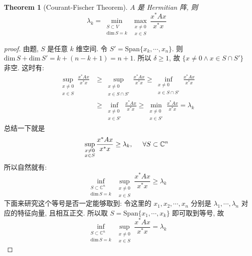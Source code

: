 \documentclass{article}
\newtheorem{theorem}{Theorem}
\def\dim{\mathrm{dim}\,}
\begin{document}
\begin{theorem}[Courant-Fischer Theorem]
  $A$ 是 Hermitian 阵, 则
  \[\lambda_k = \min_{\substack{S\subset V\\ \dim S = k}}\max_{\substack{x\not=0\\x\in S}}\frac{x^*Ax}{x^*x}\]
\end{theorem}
\begin{proof}[proof]
  由题, $S$ 是任意 $k$ 维空间.
  令 $S' = \mathrm{Span}\{x_k, \cdots, x_n\}$.
  则 $\dim S + \dim S' = k + (n - k + 1) = n + 1$.
  所以 $\delta \geq 1$, 故 $\{x\not=0 \land x\in S\cap S'\}$ 非空.
  这时有:
  \begin{align*}
    \sup_{\substack{x\not=0\\x\in S}}\frac{x^*Ax}{x^*x} &\geq \sup_{\substack{x\not=0\\x\in S\cap S'}}\frac{x^*Ax}{x^*x} \geq \inf_{\substack{x\not=0\\x\in S\cap S'}} \frac{x^*Ax}{x^*x} \\
    &\geq \inf_{\substack{x\not=0\\x\in S'}}\frac{x^*Ax}{x^*x} \geq \min_{\substack{x\not=0\\x\in S'}}\frac{x^*Ax}{x^*x} = \lambda_k
  \end{align*}
  总结一下就是
  \[\sup_{\substack{x\not=0\\x\in S}} \frac{x^*Ax}{x^*x} \geq \lambda_k, \hspace{0.5cm} \forall S\subset \mathbb{C}^n\]
  所以自然就有:
  \[\inf_{\substack{S\subset \mathbb{C}^n\\ \dim S = k}}\sup_{\substack{x\not=0\\x\in S}} \frac{x^*Ax}{x^*x} \geq \lambda_k\]
  下面来研究这个等号是否一定能够取到:
  令这里的 $x_1, x_2, \cdots, x_n$ 分别是 $\lambda_1, \cdots, \lambda_n$ 对应的特征向量, 且相互正交.
  所以取 $S = \mathrm{Span}\{x_1, \cdots, x_k\}$ 即可取到等号, 故
  \[\inf_{\substack{S\subset \mathbb{C}^n\\ \dim S = k}}\sup_{\substack{x\not=0\\x\in S}} \frac{x^*Ax}{x^*x} = \lambda_k\]
\end{proof}
\end{document}

